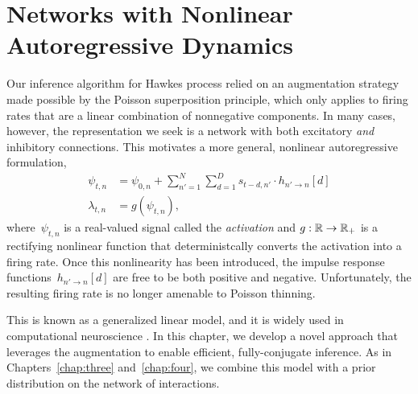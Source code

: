 
\chapter{Networks with Nonlinear Autoregressive Dynamics}

Our inference algorithm for Hawkes process relied on an augmentation strategy 
made possible by the Poisson superposition principle, which 
only applies to firing rates that are a linear combination of 
nonnegative components. 
In many cases, however, the representation we 
seek is a network with both excitatory \emph{and} inhibitory 
connections. This motivates a more general, nonlinear autoregressive
formulation,
\begin{align*}
\psi_{t,n} &= \psi_{0,n} + \sum_{n'=1}^N \sum_{d=1}^{D} s_{t-d, n'} \cdot h_{n' \to n}[d] \\
\lambda_{t,n} &= g(\psi_{t,n}),
\end{align*}
where~$\psi_{t,n}$ is a real-valued signal called the \emph{activation} and 
${g: \mathbb{R} \to \mathbb{R}_+}$ is a rectifying nonlinear function that
deterministcally  converts
the activation into a firing rate. 
Once this nonlinearity has been introduced, the impulse response 
functions~$h_{n' \to n}[d]$ are free to be both positive and negative. 
Unfortunately, the resulting firing rate is no longer amenable to 
Poisson thinning.

This is known as a generalized 
linear model, and it is widely used in computational neuroscience 
\cite{Paninski-2004, Truccolo-2005, Pillow-2008}. 
In this chapter, we develop a novel approach that leverages the 
\polyagamma augmentation to enable efficient, fully-conjugate 
inference. As in Chapters~\ref{chap:three} and~\ref{chap:four}, 
we combine this model with a 
prior distribution on the network of interactions.

